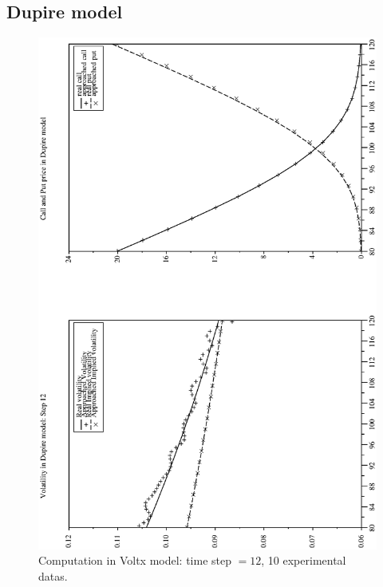 \documentclass[a4paper]{article}
\begin{document}
\subsection{Dupire model}
\begin{figure}[tbp]
\begin{center}
\includegraphics[width=12.5cm]{ArticlePS/Voltx12.eps}
\caption{Computation in Voltx model: time step $=12$, 10
experimental datas.\label{voltx}}
\end{center}
\end{figure}
\end{document}

